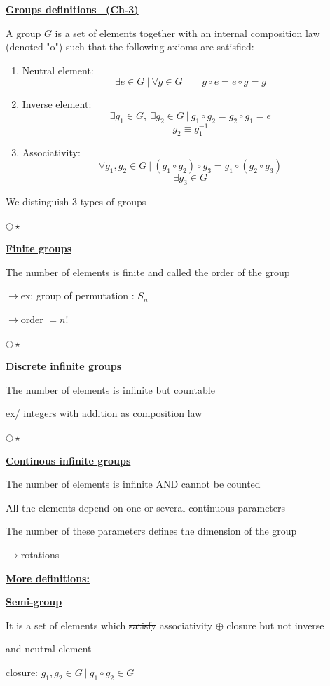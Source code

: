 \documentclass[12pt,a4paper]{article}
\newcommand{\heading}[1]{\par\vspace{0.2em}\underline{\textbf{#1}}\par\vspace{0.15em}}
\newcommand{\starheading}[1]{\par\vspace{0.18em}\(\bigcirc\!\star\)\quad\heading{#1}}
\newcommand{\arrowline}{\(\longrightarrow\)\quad}
\begin{document}
\normalsize

\heading{Groups definitions \ (Ch-3)}

A group \(G\) is a set of elements together with an internal composition law (denoted "o") such that the following axioms are satisfied:

\begin{enumerate}[label=\roman*)]
\item Neutral element:
\[
\exists e\in G\ \big|\ \forall g\in G\qquad g\circ e=e\circ g=g
\]

\item Inverse element:
\[
\exists g_1\in G,\ \exists g_2\in G\ \big|\ g_1\circ g_2=g_2\circ g_1=e
\]
\[
g_2\equiv g_1^{-1}
\]

\item Associativity:
\[
\forall g_1,g_2\in G\ \big|\ (g_1\circ g_2)\circ g_3=g_1\circ(g_2\circ g_3)
\]
\[
\exists g_3\in G
\]
\end{enumerate}

We distinguish 3 types of groups

\starheading{Finite groups}

The number of elements is finite and called the \underline{order of the group}

\arrowline ex: group of permutation : \(S_n\)

\arrowline order \(=n!\)

\starheading{Discrete infinite groups}

The number of elements is infinite but countable

ex/ integers with addition as composition law

\starheading{Continous infinite groups}

The number of elements is infinite AND cannot be counted

All the elements depend on one or several continuous parameters

The number of these parameters defines the dimension of the group

\arrowline rotations

\newpage

\heading{More definitions:}

\heading{Semi-group}

It is a set of elements which \sout{satisfy} associativity \(\oplus\) closure but not inverse

and neutral element

closure: \(g_1,g_2\in G\ \big|\ g_1\circ g_2\in G\)
\end{document}
